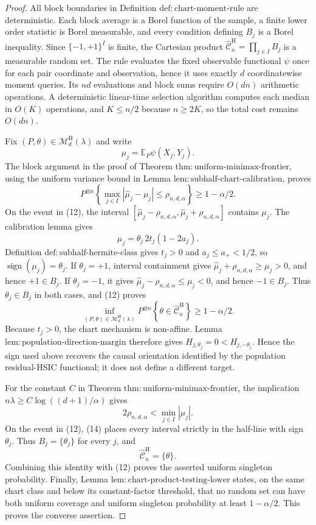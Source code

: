 \documentclass{article}
\begin{document}
\begin{proof}
All block boundaries in Definition \(\mathrm{def:chart\text{-}moment\text{-}rule}\) are deterministic.  Each block average is a Borel function of the sample, a finite lower order statistic is Borel measurable, and every condition defining \(B_j\) is a Borel inequality.  Since \(\{-1,+1\}^I\) is finite, the Cartesian product \(\widehat{\mathcal C}_n^{\mathrm H}=\prod_{j\in I}B_j\) is a measurable random set.  The rule evaluates the fixed observable functional \(\psi\) once for each pair coordinate and observation, hence it uses exactly \(d\) coordinatewise moment queries.  Its \(nd\) evaluations and block sums require \(O(dn)\) arithmetic operations.  A deterministic linear-time selection algorithm computes each median in \(O(K)\) operations, and \(K\le n/2\) because \(n\ge2K\), so the total cost remains \(O(dn)\).

Fix \((P,\theta)\in\mathcal M_d^{\mathrm H}(\lambda)\) and write
\[
\mu_j=\mathbb E_P\psi(X_j,Y_j).
\]
The block argument in the proof of Theorem \(\mathrm{thm:uniform\text{-}minimax\text{-}frontier}\), using the uniform variance bound in Lemma \(\mathrm{lem:subhalf\text{-}chart\text{-}calibration}\), proves
\[
P^{\otimes n}\left\{\max_{j\in I}|\widehat\mu_j-\mu_j|
\le\rho_{n,d,\alpha}\right\}
\ge1-\alpha/2.
\tag{12}
\]
On the event in (12), the interval \([\widehat\mu_j-\rho_{n,d,\alpha},\widehat\mu_j+\rho_{n,d,\alpha}]\) contains \(\mu_j\).  The calibration lemma gives
\[
\mu_j=\theta_j\,2t_j(1-2a_j).
\]
Definition \(\mathrm{def:subhalf\text{-}hermite\text{-}class}\) gives \(t_j>0\) and \(a_j\le a_+<1/2\), so \(\operatorname{sign}(\mu_j)=\theta_j\).  If \(\theta_j=+1\), interval containment gives \(\widehat\mu_j+\rho_{n,d,\alpha}\ge\mu_j>0\), and hence \(+1\in B_j\).  If \(\theta_j=-1\), it gives \(\widehat\mu_j-\rho_{n,d,\alpha}\le\mu_j<0\), and hence \(-1\in B_j\).  Thus \(\theta_j\in B_j\) in both cases, and (12) proves
\[
\inf_{(P,\theta)\in\mathcal M_d^{\mathrm H}(\lambda)}
P^{\otimes n}\left\{\theta\in\widehat{\mathcal C}_n^{\mathrm H}\right\}
\ge1-\alpha/2.
\tag{13}
\]
Because \(t_j>0\), the chart mechanism is non-affine.  Lemma \(\mathrm{lem:population\text{-}direction\text{-}margin}\) therefore gives \(H_{j,\theta_j}=0<H_{j,-\theta_j}\).  Hence the sign used above recovers the causal orientation identified by the population residual-HSIC functional; it does not define a different target.

For the constant \(C\) in Theorem \(\mathrm{thm:uniform\text{-}minimax\text{-}frontier}\), the implication \(n\lambda\ge C\log((d+1)/\alpha)\) gives
\[
2\rho_{n,d,\alpha}<\min_{j\in I}|\mu_j|.
\tag{14}
\]
On the event in (12), (14) places every interval strictly in the half-line with sign \(\theta_j\).  Thus \(B_j=\{\theta_j\}\) for every \(j\), and
\[
\widehat{\mathcal C}_n^{\mathrm H}=\{\theta\}.
\]
Combining this identity with (12) proves the asserted uniform singleton probability.  Finally, Lemma \(\mathrm{lem:chart\text{-}product\text{-}testing\text{-}lower}\) states, on the same chart class and below its constant-factor threshold, that no random set can have both uniform coverage and uniform singleton probability at least \(1-\alpha/2\).  This proves the converse assertion.
\end{proof}
\end{document}
